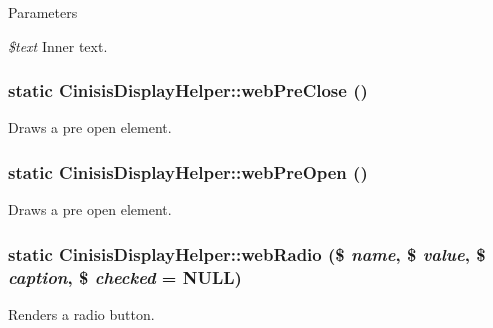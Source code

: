 \begin{DoxyParams}{Parameters}
\item[{\em \$text}]Inner text. \end{DoxyParams}
\hypertarget{classCinisisDisplayHelper_af4d61af3ed8211300032a208175d72ed}{
\subsubsection[{webPreClose}]{\setlength{\rightskip}{0pt plus 5cm}static CinisisDisplayHelper::webPreClose ()}}
\label{classCinisisDisplayHelper_af4d61af3ed8211300032a208175d72ed}
Draws a pre open element. \hypertarget{classCinisisDisplayHelper_a9c2a28e3865e8b3950b428770a132aa0}{
\subsubsection[{webPreOpen}]{\setlength{\rightskip}{0pt plus 5cm}static CinisisDisplayHelper::webPreOpen ()}}
\label{classCinisisDisplayHelper_a9c2a28e3865e8b3950b428770a132aa0}
Draws a pre open element. \hypertarget{classCinisisDisplayHelper_abd8110a9976bb72b42992b28b5aae80d}{
\subsubsection[{webRadio}]{\setlength{\rightskip}{0pt plus 5cm}static CinisisDisplayHelper::webRadio (\$ {\em name}, \/  \$ {\em value}, \/  \$ {\em caption}, \/  \$ {\em checked} = {\ttfamily NULL})}}
\label{classCinisisDisplayHelper_abd8110a9976bb72b42992b28b5aae80d}
Renders a radio button.


